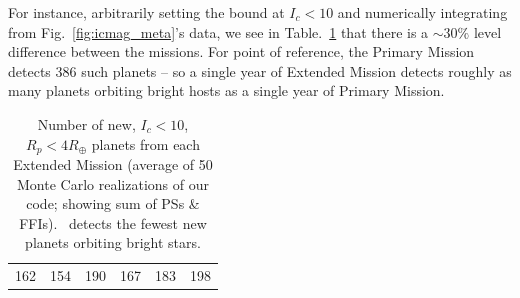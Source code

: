 For instance, arbitrarily setting the bound at $I_c<10$ and numerically integrating from Fig.~\ref{fig:icmag_meta}'s data, we see in Table.~\ref{tab:icmag_meta} that there is a $\sim30\%$ level difference between the missions.
For point of reference, the Primary Mission detects 386 such planets -- so a single year of Extended Mission detects roughly as many planets orbiting bright hosts as a single year of Primary Mission.
\begin{table}[!t]
	\centering
	\caption{Number of new, $I_c<10$, $R_p<4R_\oplus$ planets from each Extended Mission (average of 50 Monte Carlo realizations of our code; showing sum of PSs \& FFIs). \npole\ detects the fewest new planets orbiting bright stars.}
	\label{tab:icmag_meta}
	\begin{tabular}{|c|c|c|c|c|c|}
		\hline
		\nhemi & \npole & \shemiAvoid & \elong & \eshort & \hemis \\ \hline
		162    & 154    & 190         & 167    & 183     & 198    \\ \hline
	\end{tabular}
\end{table}

